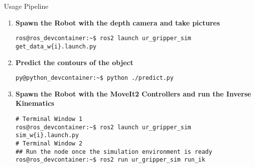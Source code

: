 \begin{frame}[fragile]{Usage Pipeline}
    \begin{enumerate}
        \item \textbf{Spawn the Robot with the depth camera and take pictures} \par
        \begin{verbatim}
ros@ros_devcontainer:~$ ros2 launch ur_gripper_sim get_data_w{i}.launch.py
        \end{verbatim}
        \item \textbf{Predict the contours of the object} \par
        \begin{verbatim}
py@python_devcontainer:~$ python ./predict.py
        \end{verbatim}
        \item \textbf{Spawn the Robot with the MoveIt2 Controllers and run the Inverse Kinematics} \par
        \begin{verbatim}
# Terminal Window 1
ros@ros_devcontainer:~$ ros2 launch ur_gripper_sim sim_w{i}.launch.py
# Terminal Window 2
## Run the node once the simulation environment is ready
ros@ros_devcontainer:~$ ros2 run ur_gripper_sim run_ik
        \end{verbatim}
    \end{enumerate}
\end{frame}